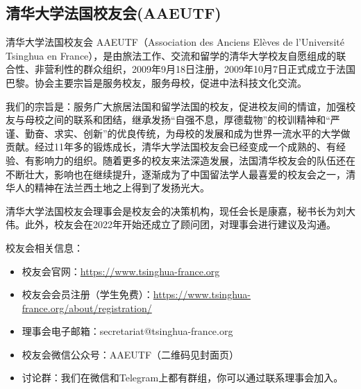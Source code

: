 \subsection{清华大学法国校友会(AAEUTF)}

清华大学法国校友会 AAEUTF（Association des Anciens Elèves de l’Université Tsinghua en France），是由旅法工作、交流和留学的清华大学校友自愿组成的联合性、非营利性的群众组织，2009年9月18日注册，2009年10月7日正式成立于法国巴黎。协会主要宗旨是服务校友，服务母校，促进中法科技文化交流。

我们的宗旨是：服务广大旅居法国和留学法国的校友，促进校友间的情谊，加强校友与母校之间的联系和团结，继承发扬“自强不息，厚德载物”的校训精神和“严谨、勤奋、求实、创新”的优良传统，为母校的发展和成为世界一流水平的大学做贡献。经过11年多的锻炼成长，清华大学法国校友会已经变成一个成熟的、有经验、有影响力的组织。随着更多的校友来法深造发展，法国清华校友会的队伍还在不断壮大，影响也在继续提升，逐渐成为了中国留法学人最喜爱的校友会之一，清华人的精神在法兰西土地之上得到了发扬光大。

清华大学法国校友会理事会是校友会的决策机构，现任会长是康嘉，秘书长为刘大伟。此外，校友会在2022年开始还成立了顾问团，对理事会进行建议及沟通。

校友会相关信息：
\begin{itemize}
    \item 校友会官网：\href{https://www.tsinghua-france.org}{https://www.tsinghua-france.org}
    \item 校友会会员注册（学生免费）：\href{https://www.tsinghua-france.org/about/registration/}{https://www.tsinghua-france.org/about/registration/}
    \item 理事会电子邮箱：secretariat@tsinghua-france.org 
    \item 校友会微信公众号：AAEUTF（二维码见封面页）
    \item 讨论群：我们在微信和Telegram上都有群组，你可以通过联系理事会加入。
\end{itemize}
